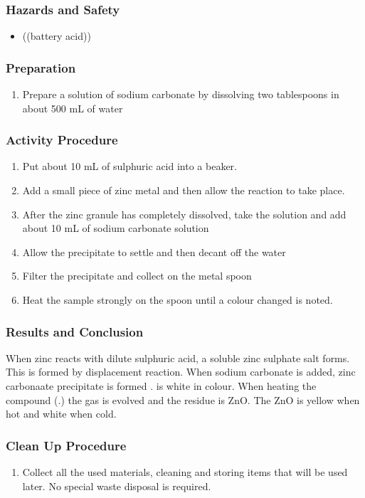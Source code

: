 \subsubsection*{Hazards and Safety}
\begin{itemize}
\item{((battery acid))}
\end{itemize}
\subsubsection*{Preparation}
\begin{enumerate}
\item{Prepare a solution of sodium carbonate by dissolving two tablespoons in about 500 mL of water}
\end{enumerate}

\subsubsection*{Activity Procedure}
\begin{enumerate}
\item{Put about 10 mL of sulphuric acid into a beaker.}
\item{Add a small piece of zinc metal and then allow the reaction to take place.}
\item{After the zinc granule has completely dissolved, take the solution and add about 10 mL of sodium carbonate solution}
\item{Allow the precipitate to settle and then decant off the water}
\item{Filter the precipitate and collect on the metal spoon}
\item{Heat the sample strongly on the spoon  until a colour changed is noted.}
\end{enumerate}

\subsubsection*{Results and Conclusion}
When zinc reacts with dilute sulphuric acid, a soluble zinc sulphate salt forms. This is formed by displacement reaction. When sodium carbonate is added, zinc carbonaate precipitate is formed .  is white in colour. When heating the compound (.) the gas  is evolved and the residue is ZnO. The ZnO is yellow when hot and white when cold.

\subsubsection*{Clean Up Procedure}
\begin{enumerate}
\item{Collect all the used materials, cleaning and storing items that will be used later. No special waste disposal is required.}
\end{enumerate}

